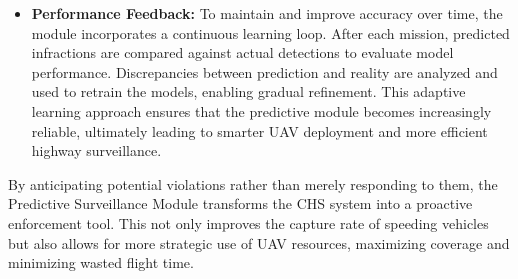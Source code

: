 \begin{itemize}
    \item \textbf{Performance Feedback:}  
    To maintain and improve accuracy over time, the module incorporates a continuous learning loop. After each mission, predicted infractions are compared against actual detections to evaluate model performance. Discrepancies between prediction and reality are analyzed and used to retrain the models, enabling gradual refinement. This adaptive learning approach ensures that the predictive module becomes increasingly reliable, ultimately leading to smarter UAV deployment and more efficient highway surveillance.
\end{itemize}

By anticipating potential violations rather than merely responding to them, the Predictive Surveillance Module transforms the CHS system into a proactive enforcement tool. This not only improves the capture rate of speeding vehicles but also allows for more strategic use of UAV resources, maximizing coverage and minimizing wasted flight time.









